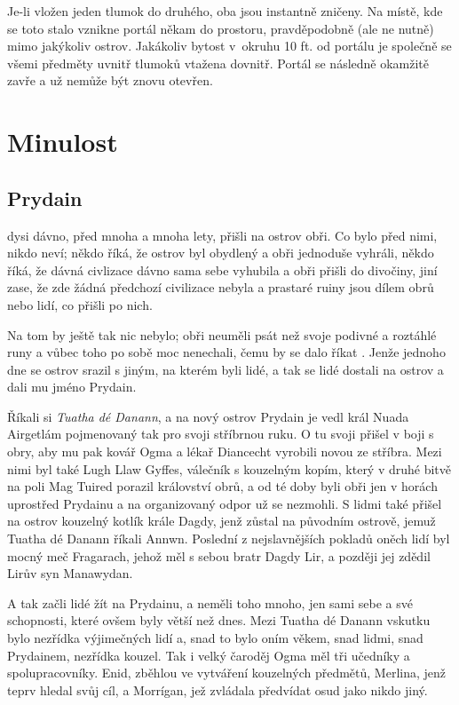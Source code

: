 \documentclass[a4paper,twocolumn,openany,nodeprecatedcode, justified]{dndbook}
\begin{document}
	Je-li vložen jeden tlumok do druhého, oba jsou instantně zničeny. Na místě, kde se toto stalo vznikne portál někam do prostoru, pravděpodobně (ale ne nutně) mimo jakýkoliv ostrov. Jakákoliv bytost v~okruhu 10 ft. od portálu je společně se všemi předměty uvnitř tlumoků vtažena dovnitř. Portál se následně okamžitě zavře a už nemůže být znovu otevřen.
	

	
	
	
	\part{Minulost}
	
	\chapter{Prydain}
	
	dysi dávno, před mnoha a mnoha lety, přišli na ostrov obři. Co bylo před nimi, nikdo neví; někdo říká, že ostrov byl obydlený a obři jednoduše vyhráli, někdo říká, že dávná civlizace dávno sama sebe vyhubila a obři přišli do divočiny, jiní zase, že zde žádná předchozí civilizace nebyla a prastaré ruiny jsou dílem obrů nebo lidí, co přišli po nich.
	
	Na tom by ještě tak nic nebylo; obři neuměli psát než svoje podivné a roztáhlé runy a vůbec toho po sobě moc nenechali, čemu by se dalo říkat . Jenže jednoho dne se ostrov srazil s jiným, na kterém byli lidé, a tak se lidé dostali na ostrov a dali mu jméno Prydain.
	
	Říkali si \emph{Tuatha dé Danann}, a na nový ostrov Prydain je vedl král Nuada Airgetlám pojmenovaný tak pro svoji stříbrnou ruku. O tu svoji přišel v boji s obry, aby mu pak kovář Ogma a lékař Diancecht vyrobili novou ze stříbra. Mezi nimi byl také Lugh Llaw Gyffes, válečník s kouzelným kopím, který v druhé bitvě na poli Mag Tuired porazil království obrů, a od té doby byli obři jen v horách uprostřed Prydainu a na organizovaný odpor už se nezmohli. S lidmi také přišel na ostrov kouzelný kotlík krále Dagdy, jenž zůstal na původním ostrově, jemuž Tuatha dé Danann říkali Annwn. Poslední z nejslavnějších pokladů oněch lidí byl mocný meč Fragarach, jehož měl s sebou bratr Dagdy Lir, a později jej zdědil Lirův syn Manawydan.
	
	A tak začli lidé žít na Prydainu, a neměli toho mnoho, jen sami sebe a své schopnosti, které ovšem byly větší než dnes. Mezi Tuatha dé Danann vskutku bylo nezřídka výjimečných lidí a, snad to bylo oním věkem, snad lidmi, snad Prydainem, nezřídka kouzel. Tak i velký čaroděj Ogma měl tři učedníky a spolupracovníky. Enid, zběhlou ve vytváření kouzelných předmětů, Merlina, jenž teprv hledal svůj cíl, a Morrígan, jež zvládala předvídat osud jako nikdo jiný.
	
\end{document}

